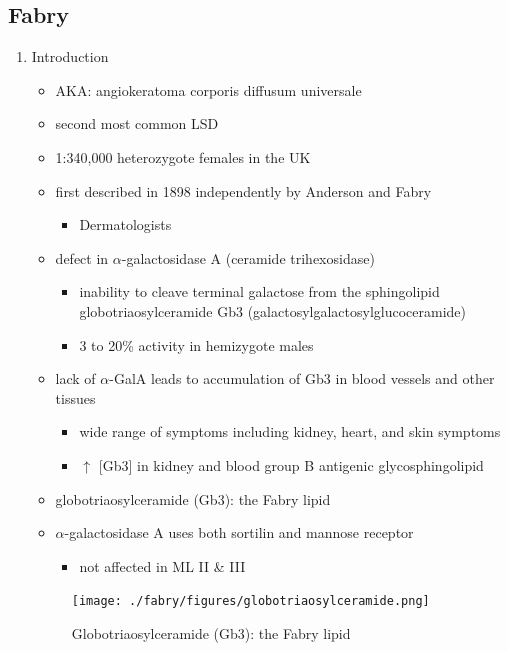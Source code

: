 \documentclass{scrartcl}
\begin{document}
\subsection{Fabry}
\label{sec:org76ebf3c}
\begin{enumerate}
\item Introduction
\label{sec:org652872a}
\begin{itemize}
\item AKA: angiokeratoma corporis diffusum universale
\item second most common LSD
\item 1:340,000 heterozygote females in the UK
\item first described in 1898 independently by Anderson and Fabry
\begin{itemize}
\item Dermatologists
\end{itemize}
\item defect in \(\alpha\)-galactosidase A (ceramide trihexosidase)
\begin{itemize}
\item inability to cleave terminal galactose from the sphingolipid globotriaosylceramide Gb3 (galactosylgalactosylglucoceramide)
\item 3 to 20\% activity in hemizygote males
\end{itemize}
\item lack of \(\alpha\)-GalA leads to accumulation of Gb3 in blood vessels and other tissues
\begin{itemize}
\item wide range of symptoms including kidney, heart, and skin symptoms
\item \(\uparrow\) [Gb3] in kidney and blood group B antigenic glycosphingolipid
\end{itemize}
\item globotriaosylceramide (Gb3): the Fabry lipid
\item \(\alpha\)-galactosidase A uses both sortilin and mannose receptor
\begin{itemize}
\item not affected in ML II \& III
\end{itemize}
\end{itemize}

\begin{figure}[htbp]
\centering
\texttt{[image: ./fabry/figures/globotriaosylceramide.png]}
\caption[Globotriaosylceramide]{\label{fig:org9d538c1}
Globotriaosylceramide (Gb3): the Fabry lipid}
\end{figure}


\end{enumerate}
\end{document}
